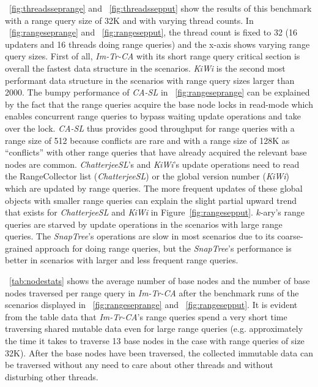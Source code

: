 \documentclass[a4paper,UKenglish]{oasics-v2016}
\newcommand{\kary}{\mbox{$k$-ary}\xspace}
\begin{document}
\figurename~\ref{fig:threadsseprange} and \figurename~\ref{fig:threadssepput} show the results of this benchmark with a range query size of 32K and with varying thread counts.
In \figurename~\ref{fig:rangeseprange} and \figurename~\ref{fig:rangesepput}, the thread count is fixed to 32 (16 updaters and 16 threads doing range queries) and the x-axis shows varying range query sizes.
First of all, \emph{Im-Tr-CA} with its short range query critical section is overall the fastest data structure in the scenarios.
\emph{KiWi} is the second most performant data structure in the scenarios with range query sizes larger than 2000. %
The bumpy performance of \emph{CA-SL} in \figurename~\ref{fig:rangeseprange} can be explained by the fact that the range queries acquire the base node locks in read-mode which enables concurrent range queries to bypass waiting update operations and take over the lock.
\emph{CA-SL} thus provides good throughput for range queries with a range size of 512 because conflicts are rare and with a range size of 128K as ``conflicts'' with other range queries that have already acquired the relevant base nodes are common. %
%
\emph{ChatterjeeSL}'s and \emph{KiWi}'s update operations need to read the RangeCollector list (\emph{ChatterjeeSL}) or the global version number (\emph{KiWi}) which are updated by range queries.
The more frequent updates of these global objects with smaller range queries can explain the slight partial upward trend that exists for \emph{ChatterjeeSL} and \emph{KiWi} in Figure~\ref{fig:rangesepput}.
\kary{}'s range queries are starved by update operations in the scenarios with large range queries.
The \emph{SnapTree}'s operations are slow in most scenarios due to its coarse-grained approach for doing range queries, but the \emph{SnapTree}'s performance is better in scenarios with larger and less frequent range queries.

\tablename~\ref{tab:nodestats} shows the average number of base nodes and the number of base nodes traversed per range query in \emph{Im-Tr-CA} after the benchmark runs of the scenarios displayed in \figurename~\ref{fig:rangeseprange} and \figurename~\ref{fig:rangesepput}.
It is evident from the table data that \emph{Im-Tr-CA}'s range queries spend a very short time traversing shared mutable data even for large range queries (e.g. approximately the time it takes to traverse 13 base nodes in the case with range queries of size 32K).
After the base nodes have been traversed, the collected immutable data can be traversed without any need to care about other threads and without disturbing other threads.
 
\end{document}
